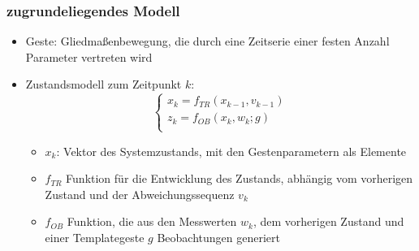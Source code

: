 \documentclass{beamer}
\begin{document}
\begin{frame}\frametitle{zugrundeliegendes Modell}
\begin{itemize}
\item Geste: Gliedmaßenbewegung, die durch eine Zeitserie einer festen Anzahl Parameter vertreten wird
\item Zustandsmodell zum Zeitpunkt $k$:
\begin{equation}
\left\{\begin{array}{l}
x_k = f_{TR} (x_{k-1}, v_{k-1}) \\
z_k = f_{OB} (x_k, w_k; g) \\
\end{array}\right.
\end{equation} 	
\begin{itemize}
\item $x_k$: Vektor des Systemzustands, mit den Gestenparametern als Elemente
\item $f_{TR}$ Funktion für die Entwicklung des Zustands, abhängig vom vorherigen Zustand und der Abweichungssequenz $v_k$
\item $f_{OB}$ Funktion, die aus den Messwerten $w_k$, dem vorherigen Zustand und einer Templategeste $g$ Beobachtungen generiert
\end{itemize}
\end{itemize}
\end{frame}
\end{document}
